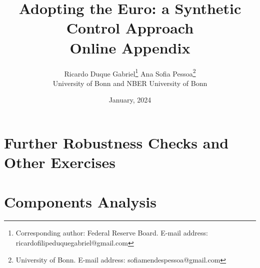 \documentclass[12pt]{article}
\title{Adopting the Euro: a Synthetic Control Approach \\ Online Appendix\\ \vspace{2em}}
\date{\vspace{3em} January, 2024}
\author{\hspace{-2em} Ricardo Duque Gabriel\footnote{Corresponding author: Federal Reserve Board. E-mail address: ricardofilipeduquegabriel@gmail.com} \hspace{5em} Ana Sofia Pessoa\footnote{University of Bonn. E-mail address: sofiamendespessoa@gmail.com}\\ \hspace{-3em} University of Bonn and NBER \hspace{3em} University of Bonn}
\begin{document}
\begin{titlepage}
\clearpage\thispagestyle{empty}
\maketitle

\end{titlepage}

\section{Further Robustness Checks and Other Exercises}

\section{\label{SS_Components} Components Analysis}
\end{document}
